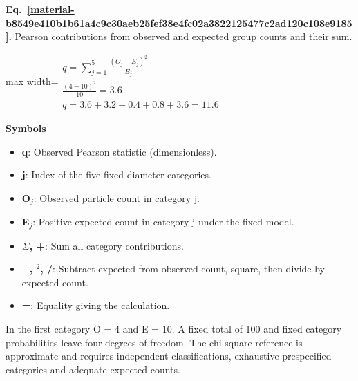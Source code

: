 \documentclass[11pt,a4paper]{article}
\begin{document}
\par\medskip
\begin{samepage}
\label{material-b8549e410b1b61a4c9c30aeb25fef38e4fc02a3822125477c2ad120c108e9185}
\noindent\textbf{Eq.~\ref*{material-b8549e410b1b61a4c9c30aeb25fef38e4fc02a3822125477c2ad120c108e9185}.} Pearson contributions from observed and expected group counts and their sum.\par\nopagebreak
\begin{center}\begin{adjustbox}{max width=\linewidth}$\displaystyle \begin{gathered}q=\sum_{j=1}^{5}\frac{(O_j-E_j)^2}{E_j}\\\frac{(4-10)^2}{10}=3.6\\q=3.6+3.2+0.4+0.8+3.6=11.6\end{gathered}$\end{adjustbox}\end{center}

\par\noindent\textbf{Symbols}

\begin{itemize}\setlength{\itemsep}{1pt}\setlength{\parsep}{0pt}
\item \textbf{q}: Observed Pearson statistic (dimensionless).
\item \textbf{j}: Index of the five fixed diameter categories.
\item \textbf{O\ensuremath{{}_j}}: Observed particle count in category j.
\item \textbf{E\ensuremath{{}_j}}: Positive expected count in category j under the fixed model.
\item \textbf{\ensuremath{\Sigma}, +}: Sum all category contributions.
\item \textbf{\ensuremath{-}, \ensuremath{{}^2}, /}: Subtract expected from observed count, square, then divide by expected count.
\item \textbf{=}: Equality giving the calculation.
\end{itemize}

In the first category O = 4 and E = 10. A fixed total of 100 and fixed category probabilities leave four degrees of freedom. The chi-square reference is approximate and requires independent classifications, exhaustive prespecified categories and adequate expected counts.

\end{samepage}
\medskip
\end{document}
